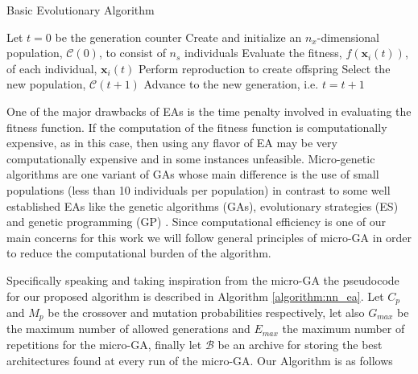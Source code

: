 \documentclass[journal]{IEEEtran}
\begin{document}
\begin{algorithm}[!htb]
\caption{Basic Evolutionary Algorithm}
\begin{algorithmic}
\State Let $t = 0$ be the generation counter
\State Create and initialize an $n_x$-dimensional population, $\mathcal{C}(0)$, to consist of $n_s$ individuals
	\State Evaluate the fitness, $f(\mathbf{x}_i(t))$, of each individual, $\mathbf{x}_i(t)$
	\State Perform reproduction to create offspring
	\State Select the new population, $\mathcal{C}(t+1)$
	\State Advance to the new generation, i.e. $t = t +1$
\EndWhile
\end{algorithmic}
\label{algorithm:generic_ea}
\end{algorithm}

One of the major drawbacks of EAs is the time penalty involved in evaluating the fitness function. If the computation of the fitness function is computationally expensive, as in this case, then using any flavor of EA may be very computationally expensive and in some instances unfeasible. Micro-genetic algorithms \cite{Krishnakumar1989} are one variant of GAs whose main difference is the use of small populations (less than 10 individuals per population) in contrast to some well established EAs like the genetic algorithms (GAs), evolutionary strategies (ES) and genetic programming (GP) \cite{Engelbrecht2007}. Since computational efficiency is one of our main concerns for this work we will follow general principles of micro-GA in order to reduce the computational burden of the algorithm. 

Specifically speaking and taking inspiration from the micro-GA the pseudocode for our proposed algorithm is described in Algorithm \ref{algorithm:nn_ea}. Let $C_p$ and $M_p$ be the crossover and mutation probabilities respectively, let also $G_{max}$ be the maximum number of allowed generations and $E_{max}$ the maximum number of repetitions for the micro-GA, finally let $\mathcal{B}$ be an archive for storing the best architectures found at every run of the micro-GA. Our Algorithm is as follows
\end{document}
